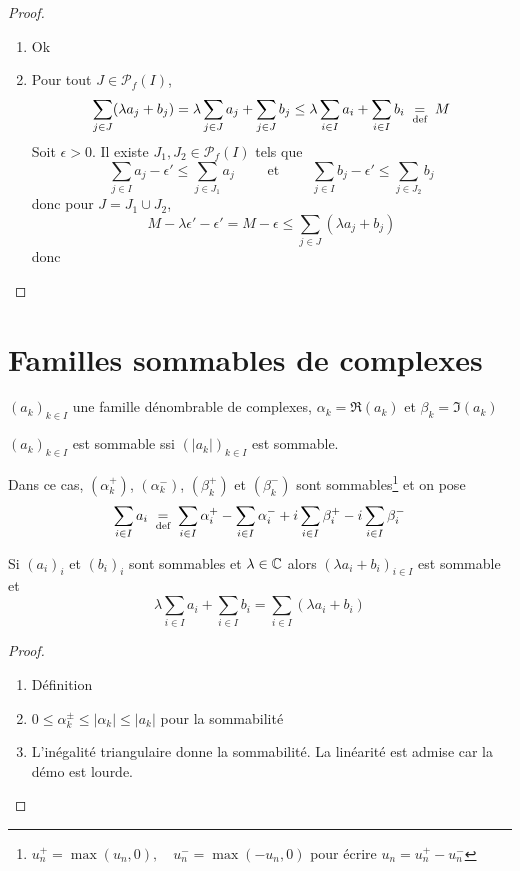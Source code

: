 \begin{proof}~
    \begin{enumerate}
        \item Ok
        \item Pour tout $J\in \mathcal P_f(I)$, \[
                \sum_{j\in J}(\lambda a_j+b_j)=\lambda\sum_{j\in J}a_j+\sum_{j\in J}b_j\leq \lambda \sum_{i\in I}a_i+\sum_{i\in I}b_i\;\underset{\text{def}}=\; M
            \]
            Soit $\epsilon>0$. Il existe $J_1, J_2\in\mathcal P_f(I)$ tels que \[
                \sum_{j\in I}a_j-\epsilon'\leq \sum_{j\in J_1}a_j\qquad \text{ et }\qquad \sum_{j\in I}b_j-\epsilon'\leq \sum_{j\in J_2}b_j
            \]
            donc pour $J=J_1\cup J_2$, \[
                M-\lambda\epsilon'-\epsilon'=M-\epsilon\leq \sum_{j\in J}(\lambda a_j+b_j)
            \]
            donc \conc
    \end{enumerate}
\end{proof}

\section{Familles sommables de complexes}

\begin{defprop}
    \Hyp $(a_k)_{k\in I}$ une famille dénombrable de complexes, $\alpha_k=\Re(a_k)$ et $\beta_k=\Im(a_k)$
    \begin{concenum}
    \item $(a_k)_{k\in I}$ est sommable ssi $(|a_k|)_{k\in I}$ est sommable.
    \item Dans ce cas, $(\alpha_k^+)$, $(\alpha_k^-)$, $(\beta_k^+)$ et $(\beta_k^-)$ sont sommables\footnote{$u_n^+=\max(u_n, 0), \quad u_n^-=\max(-u_n, 0)$ pour écrire $u_n=u_n^+-u_n^-$} et on pose \[
            \sum_{i\in I}a_i\;\underset{\text{def}}=\;\sum_{i\in I}\alpha_i^+-\sum_{i\in I}\alpha_i^-+i\sum_{i\in I}\beta_i^+-i\sum_{i\in I}\beta_i^-
        \]
    \item Si $(a_i)_i$ et $(b_i)_i$ sont sommables et $\lambda\in\mathbb C$ alors $(\lambda a_i+b_i)_{i\in I}$ est sommable et \[
            \lambda\sum_{i\in I}a_i+\sum_{i\in I}b_i=\sum_{i\in I}(\lambda a_i+b_i)
        \]
    \end{concenum}
\end{defprop}

\begin{proof}~
    \begin{enumerate}
        \item Définition
        \item $0\leq \alpha_k^\pm\leq |\alpha_k|\leq |a_k|$ pour la sommabilité
        \item L'inégalité triangulaire donne la sommabilité. La linéarité est admise car la démo est lourde.
    \end{enumerate}
\end{proof}

